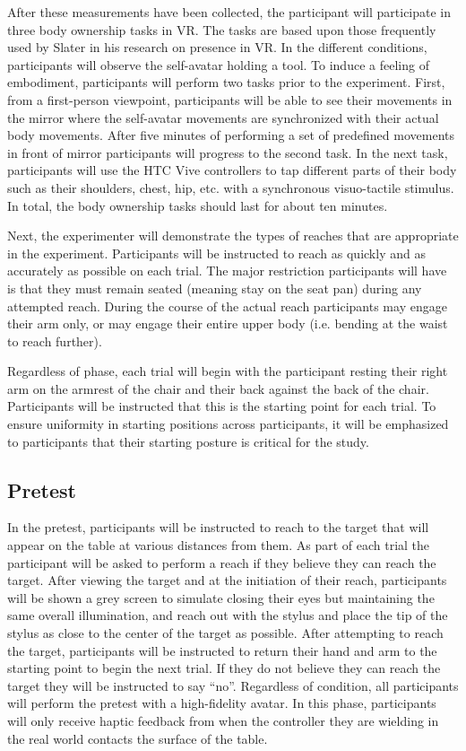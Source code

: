 After these measurements have been collected, the participant will participate in three body ownership tasks in VR. The tasks are based upon those frequently used by Slater in his research on presence in VR. In the different conditions, participants will observe the self-avatar holding a tool. To induce a feeling of embodiment, participants will perform two tasks prior to the experiment. First, from a first-person viewpoint, participants will be able to see their movements in the mirror where the self-avatar movements are synchronized with their actual body movements. After five minutes of performing a set of predefined movements in front of mirror participants will progress to the second task. In the next task, participants will use the HTC Vive controllers to tap different parts of their body such as their shoulders, chest, hip, etc. with a synchronous visuo-tactile stimulus. In total, the body ownership tasks should last for about ten minutes. 

Next, the experimenter will demonstrate the types of reaches that are appropriate in the experiment. Participants will be instructed to reach as quickly and as accurately as possible on each trial. The major restriction participants will have is that they must remain seated (meaning stay on the seat pan) during any attempted reach. During the course of the actual reach participants may engage their arm only, or may engage their entire upper body (i.e. bending at the waist to reach further).

Regardless of phase, each trial will begin with the participant resting their right arm on the armrest of the chair and their back against the back of the chair. Participants will be instructed that this is the starting point for each trial. To ensure uniformity in starting positions across participants, it will be emphasized to participants that their starting posture is critical for the study.

\subsection{Pretest}
In the pretest, participants will be instructed to reach to the target that will appear on the table at various distances from them.  As part of each trial the participant will be asked to perform a reach if they believe they can reach the target. After viewing the target and at the initiation of their reach, participants will be shown a grey screen to simulate closing their eyes but maintaining the same overall illumination, and reach out with the stylus and place the tip of the stylus as close to the center of the target as possible.  After attempting to reach the target, participants will be instructed to return their hand and arm to the starting point to begin the next trial.  If they do not believe they can reach the target they will be instructed to say “no”.  Regardless of condition, all participants will perform the pretest with a high-fidelity avatar. In this phase, participants will only receive haptic feedback from when the controller they are wielding in the real world contacts the surface of the table.

